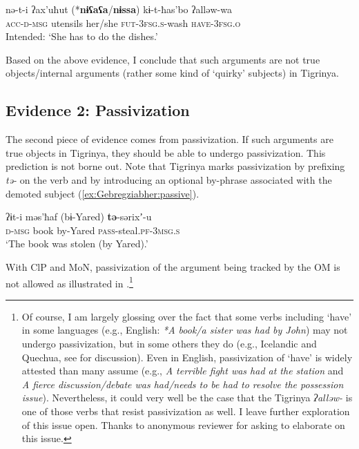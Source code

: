 \documentclass[output=paper]{langscibook}
\begin{document}
\ea\label{ex:Gebregziabher:obl-acc}
\gll nə-t-i ʔax'uħut (*{\textbf{nɨʕaʕa}}/{\textbf{nɨssa}}) kɨ-t-ħas'bo ʔalləw-wa\\
{\scshape acc-d-msg} utensils her/she  {\scshape fut-3fsg.s-}wash {\scshape have-3fsg.o}\\
\glt Intended: `She has to do the dishes.'
\z

\noindent Based on the above evidence, I conclude that such arguments are not true objects/internal arguments (rather some kind of `quirky' subjects) in Tigrinya.


\subsection{Evidence 2: Passivization}\label{sec:SOR}

The second piece of evidence comes from passivization. If such arguments are true objects in Tigrinya, they should be able to undergo passivization. This prediction is not borne out.
Note that Tigrinya marks passivization by prefixing {\emph{tə-}} on the verb and by introducing an optional by-phrase associated with the demoted subject (\ref{ex:Gebregziabher:passive}). 


\ea\label{ex:Gebregziabher:passive} 
\gll ʔɨt-i məs'ħaf (bɨ-Yared) {\textbf{tə}}-sərixʼ-u\\
{\scshape d-msg} book by-Yared {\scshape pass}-steal.{\scshape pf-3msg.s}\\
\glt `The book was stolen (by Yared).'
\z


\noindent With ClP and MoN, passivization of the argument being tracked by the OM is not allowed as illustrated in .\footnote{Of course, I am largely glossing over the fact that some verbs including `have' in some languages (e.g., English: \emph{*A book/a sister was had by John}) may not undergo passivization, but in some others they do (e.g., Icelandic and Quechua, see \citealt{myler16} for discussion). Even in English, passivization of `have' is widely attested than many assume (e.g., \emph{A terrible fight was had at the station} and \emph{A fierce discussion/debate was had/needs to be had to resolve the possession issue}). Nevertheless, it could very well be the case that the Tigrinya \emph{ʔalləw-} is one of those verbs that resist passivization as well. I leave further exploration of this issue open. Thanks to anonymous reviewer for asking to elaborate on this issue.}


\ea\label{ex:Gebregziabher:passive1}
\z
\z
\end{document}
